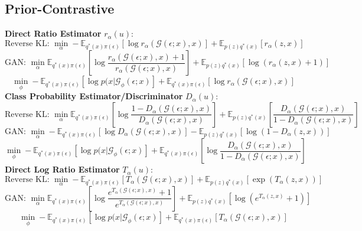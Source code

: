 \documentclass[honours,12pt]{unswthesis}
\newcommand{\E}{\mathbb{E}}
\numberwithin{equation}{section}
\theoremstyle{definition}
\begin{document}
\subsection{Prior-Contrastive}
\textbf{Direct Ratio Estimator} $r_\alpha(u)$:
\[\text{Reverse KL: }\min_\alpha -\E_{q^*(x)\pi(\epsilon)}[\log r_\alpha(\mathcal{G}(\epsilon;x),x)]+\E_{p(z)q^*(x)}[r_\alpha(z,x)]\]
\[\text{GAN: }\min_\alpha \E_{q^*(x)\pi(\epsilon)}\left[\log \frac{r_\alpha(\mathcal{G}(\epsilon;x),x)+1}{r_\alpha(\mathcal{G}(\epsilon;x),x)}\right]+\E_{p(z)q^*(x)}[\log(r_\alpha(z,x)+1)]\]
\[\min_\phi-\E_{q^*(x)\pi(\epsilon)}[\log p(x|\mathcal{G}_\phi(\epsilon;x)]+\E_{q^*(x)\pi(\epsilon)}[\log r_\alpha(\mathcal{G}(\epsilon;x),x)]\]
\textbf{Class Probability Estimator/Discriminator} $D_\alpha(u)$:
\[\text{Reverse KL: }\min_\alpha \E_{q^*(x)\pi(\epsilon)}\left[\log \frac{1-D_\alpha(\mathcal{G}(\epsilon;x),x)}{D_\alpha(\mathcal{G}(\epsilon;x),x)}\right]+\E_{p(z)q^*(x)}\left[\frac{D_\alpha(\mathcal{G}(\epsilon;x),x)}{1-D_\alpha(\mathcal{G}(\epsilon;x),x)}\right]\]
\[\text{GAN: }\min_\alpha -\E_{q^*(x)\pi(\epsilon)}[\log D_\alpha(\mathcal{G}(\epsilon;x),x)]-\E_{p(z)q^*(x)}[\log(1-D_\alpha(z,x))]\]
\[\min_\phi-\E_{q^*(x)\pi(\epsilon)}[\log p(x|\mathcal{G}_\phi(\epsilon;x)]+\E_{q^*(x)\pi(\epsilon)}\left[\log \frac{D_\alpha(\mathcal{G}(\epsilon;x),x)}{1-D_\alpha(\mathcal{G}(\epsilon;x),x)}\right]\]
\textbf{Direct Log Ratio Estimator} $T_\alpha(u)$:
\[\text{Reverse KL: }\min_\alpha -\E_{q^*(x)\pi(\epsilon)}[T_\alpha(\mathcal{G}(\epsilon;x),x)]+\E_{p(z)q^*(x)}[\exp(T_\alpha(z,x))]\]
\[\text{GAN: }\min_\alpha \E_{q^*(x)\pi(\epsilon)}\left[\log \frac{e^{T_\alpha(\mathcal{G}(\epsilon;x),x)}+1}{e^{T_\alpha(\mathcal{G}(\epsilon;x),x)}}\right]+\E_{p(z)q^*(x)}[\log(e^{T_\alpha(z,x)}+1)]\]
\[\min_\phi-\E_{q^*(x)\pi(\epsilon)}[\log p(x|\mathcal{G}_\phi(\epsilon;x)]+\E_{q^*(x)\pi(\epsilon)}[T_\alpha(\mathcal{G}(\epsilon;x),x)]\]
\end{document}
